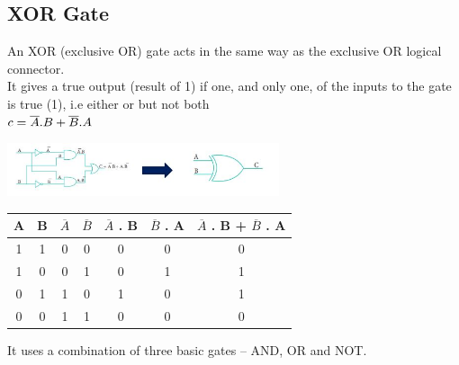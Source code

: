 \documentclass[10pt,a4paper,onecolumn]{article}
\begin{document}
\subsection{XOR Gate}
An XOR (exclusive OR) gate acts in the same way as the exclusive OR logical connector. \\
It gives a true output (result of 1) if one, and only one, of the inputs to the gate is true (1), i.e either or but not both \\
\color{red}$\\ c = \overline{A}.B + \overline{B}.A$ \\ \color{black}
\begin{center} \includegraphics[width=8cm]{gst19}\end{center}
\begin{table}[h!]
	\begin{center}
		\begin{tabular}{c|c|c|c|c|c|c}
			\textbf{A} & \textbf{B} & \textbf{$\overline{A}$} & \textbf{$\overline{B}$} & \textbf{$\overline{A}$ . B} & \textbf{$\overline{B}$ . A} & \textbf{$\overline{A}$ . B} + \textbf{$\overline{B}$ . A}\\
			\hline
			1 & 1 & 0 & 0 & 0 & 0 & 0\\
			\hline
			1 & 0 & 0 & 1 & 0 & 1 & 1\\
			\hline
			0 & 1 & 1 & 0 & 1 & 0 & 1\\
			\hline
			0 & 0 & 1 & 1 & 0 & 0 & 0\\
			\hline
		\end{tabular}
	\end{center}
\end{table} 
\color{red}It uses a combination of three basic gates – AND, OR and NOT. \\ \color{black}
\end{document}
